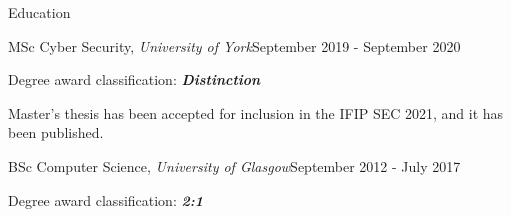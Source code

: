 \documentclass{resume}
\begin{document}
\begin{rSection}{Education}

\begin{rSubsection}{MSc Cyber Security, \textit{University of York}}{September 2019 - September 2020}{}{}
\item Degree award classification: \textbf{\textit{Distinction}}
    \item Master's thesis has been accepted for inclusion in the IFIP SEC 2021, and it has been published.
\end{rSubsection}

\begin{rSubsection}{BSc Computer Science, \textit{University of Glasgow}}{September 2012 - July 2017}{}{}
    \item Degree award classification: \textbf{\textit{2:1}}
\end{rSubsection}

\end{rSection}
\end{document}
